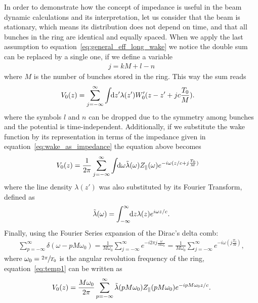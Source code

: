     In order to demonstrate how the concept of impedance is useful in the beam dynamic calculations and its interpretation, let us consider that the beam is stationary, which means its distribution does not depend on time, and that all bunches in the ring are identical and equally spaced. When we apply the last assumption to equation~\eqref{eq:general_eff_long_wake} we notice the double sum can be replaced by a single one, if we define a variable
    \begin{align*}
    	  j = kM + l - n
    \end{align*}
    where $M$ is the number of bunches stored in the ring. This way the sum reads
    \begin{align}
	  	V_0(z) = \sum_{j=-\infty}^\infty\int\!\!\text{d}z' 
				&\lambda(z')W'_0(z-z' + jc\frac{T_0}{M}).
    \end{align}
    where the symbols $l$ and $n$ can be dropped due to the symmetry among bunches and the potential is time-independent. Additionally, if we substitute the wake function by its representation in terms of the impedance given in equation~\eqref{eq:wake_as_impedance} the equation above becomes
    \begin{align}\label{eq:temp1}
	   	V_0(z) = \frac{1}{2\pi}\sum_{j=-\infty}^\infty\int\!\!\text{d}\omega 
 				&\tilde{\lambda}(\omega)Z_\parallel(\omega)e^{-i\omega(z/c + j\frac{T_0}{M})}
    \end{align}
    where the line density $\lambda(z')$ was also substituted by its Fourier  Transform, defined as
    \begin{align}
  		\tilde{\lambda}(\omega) = \int_{-\infty}^{\infty}\!\!\text{d}z \lambda(z)e^{i\omega z/c}.
    \end{align}
    Finally, using the Fourier Series expansion of the Dirac's delta comb:
    \begin{align}
  	  	\sum_{p=-\infty}^\infty \delta(\omega-pM\omega_0) =
	    	\frac{1}{M\omega_0} \sum_{j=-\infty}^\infty e^{-i2\pi j\frac{\omega}{M\omega_0}} =
	    	\frac{1}{M\omega_0} \sum_{j=-\infty}^\infty e^{-i\omega(j\frac{T_0}{M})},
    \end{align}
    where $\omega_0 = \sfrac{2\pi}{T_0}$ is the angular revolution frequency of the ring, equation~\eqref{eq:temp1} can be written as
    \begin{align}\label{eq:impedance_interpretation_long}
	  	V_0(z) = \frac{M\omega_0}{2\pi} \sum_{p=-\infty}^\infty \tilde{\lambda}(pM\omega_0)Z_\parallel(pM\omega_0)e^{-ipM\omega_0 z/c}.
    \end{align}
